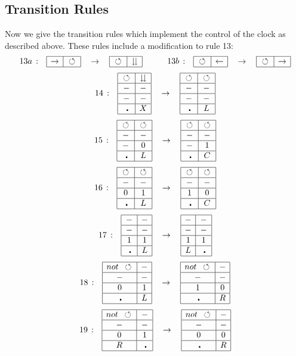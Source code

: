 \documentclass[11pt,letterpaper]{article}
\newcommand{\<}{\langle}
\renewcommand{\>}{\rangle}
\newcommand{\tur}{\,\circlearrowleft\,}   %
\newcommand{\bul}{\:\:\centerdot\:}       %
\newcommand{\goes}{\:\rightarrow\:}		%
\newcommand{\band}[2]{		%
	\begin{array}{|r|r|}
	\hline #1 & #2 \\
	\hline
	\end{array}}
\newcommand{\eight}[8]{ 		%
	\begin{array}{|c|c|}
	\hline #1 & #2 \\
	\hline #3 & #4 \\
	\hline #5 & #6 \\
	\hline #7 & #8 \\
	\hline
	\end{array}}
\begin{document}
\subsection{Transition Rules}
Now we give the transition rules which implement the control of the clock as described above. These rules include a modification to rule 13:
\begin{eqnarray}
	\begin{array}{rccccrccc}
	13a\,:& 
		\band{\rightarrow}{\tur}
		&\goes&
		\band{\tur}{\downdownarrows}
	&\quad&
	13b\,:& 
		\band{\tur}{\leftarrow}
		&\goes&
		\band{\tur}{\rightarrow}
	\end{array}	\label{rule13}
\end{eqnarray}
\begin{eqnarray}
	\begin{array}{rccccrccc}
	14\,:& 
		\eight{\tur}{\downdownarrows}{-}{-}{-}{-}{\bul}{X}
		&\goes&
		\eight{\tur}{\tur}{-}{-}{-}{-}{\bul}{L}
	\end{array}	\label{rule14}
\end{eqnarray}
\begin{eqnarray}
	\begin{array}{rccccrccc}
	15\,:& 
		\eight{\tur}{\tur}{-}{-}{-}{0}{\bul}{L}
		&\goes&
		\eight{\tur}{\tur}{-}{-}{-}{1}{\bul}{C}
	\end{array}	\label{rule15}
\end{eqnarray}
\begin{eqnarray}
	\begin{array}{rccccrccc}
	16\,:& 
		\eight{\tur}{\tur}{-}{-}{0}{1}{\bul}{L}
		&\goes&
		\eight{\tur}{\tur}{-}{-}{1}{0}{\bul}{C}
	\end{array}	\label{rule16}
\end{eqnarray}
\begin{eqnarray}
	\begin{array}{rccccrccc}
	17\,:& 
		\eight{-}{-}{-}{-}{1}{1}{\bul}{L}
		&\goes&
		\eight{-}{-}{-}{-}{1}{1}{L}{\bul}
	\end{array}	\label{rule17}
\end{eqnarray}
\begin{eqnarray}
	\begin{array}{rccccrccc}
	18\,:& 
		\eight{not~\tur}{-}{-}{-}{0}{1}{\bul}{L}
		&\goes&
		\eight{not~\tur}{-}{-}{-}{1}{0}{\bul}{R}
	\end{array}	\label{rule18}
\end{eqnarray}
\begin{eqnarray}
	\begin{array}{rccccrccc}
	19\,:& 
		\eight{not~\tur}{-}{-}{-}{0}{1}{R}{\bul}
		&\goes&
		\eight{not~\tur}{-}{-}{-}{0}{0}{\bul}{R}
	\end{array}	\label{rule19}
\end{eqnarray}
\end{document}

